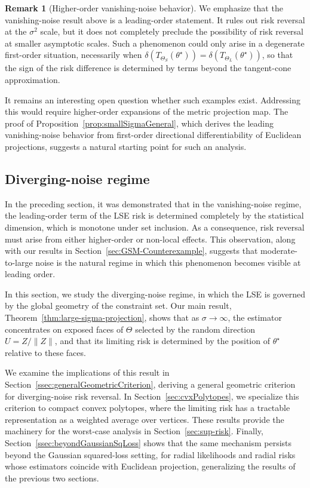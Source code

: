 \documentclass[11pt]{article}
\theoremstyle{plain}
\theoremstyle{definition}
\newtheorem*{remark}{Remark}
\begin{document}
\begin{remark}[Higher-order vanishing-noise behavior] 
We emphasize that the vanishing-noise result above is a leading-order statement. It
rules out risk reversal at the $\sigma^2$ scale, but it does not completely
preclude the possibility of risk reversal at smaller asymptotic scales. Such a
phenomenon could only arise in a degenerate first-order situation, necessarily
when $\delta\!\left(T_{\Theta_S}(\theta^\star)\right)
    =
    \delta\!\left(T_{\Theta_L}(\theta^\star)\right)$, so that the sign of the risk difference is determined by terms beyond the tangent-cone approximation.

It remains an interesting open question whether such examples exist.
Addressing this would require higher-order expansions of the metric projection
map. The proof of Proposition~\ref{prop:smallSigmaGeneral}, which derives the
leading vanishing-noise behavior from first-order directional differentiability of
Euclidean projections, suggests a natural starting point for such an analysis.
\end{remark}


\subsection{Diverging-noise regime} \label{sec:diverging-noise-asymptotic}

In the preceding section, it was demonstrated that in the vanishing-noise regime, the leading-order term of the LSE risk is determined completely by the statistical dimension, which is monotone under set inclusion. As a consequence, risk reversal must arise from either higher-order or non-local effects. This observation, along with our results in Section~\ref{sec:GSM-Counterexample}, suggests that moderate-to-large noise is the natural regime in which this phenomenon becomes visible at leading order.

In this section, we study the diverging-noise regime, in which the LSE is governed by the global geometry of the constraint set. Our main result, Theorem~\ref{thm:large-sigma-projection}, shows that as $\sigma\to\infty$, the estimator concentrates on exposed faces of $\Theta$ selected by the random direction $U=Z/\|Z\|$, and that its limiting risk is determined by the position of $\theta^\star$ relative to these faces.

 We examine the implications of this result in Section~\ref{ssec:generalGeometricCriterion}, deriving a general geometric criterion for diverging-noise risk reversal. In Section~\ref{sec:cvxPolytopes}, we specialize this criterion to compact convex polytopes, where the limiting risk has a tractable representation as a weighted average over vertices. These results provide the machinery for the worst-case analysis in Section~\ref{sec:sup-risk}. Finally, Section~\ref{ssec:beyondGaussianSqLoss} shows that the same mechanism persists beyond the Gaussian squared-loss setting, for radial likelihoods and radial risks whose estimators coincide with Euclidean projection, generalizing the results of the previous two sections.
\end{document}
